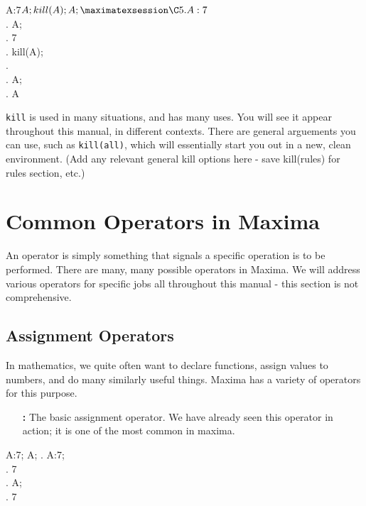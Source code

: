 \beginmaximasession
A:7$
A;
kill(A);
A;
\maximatexsession
\C5.  A:7$ \\
.  A; \\
.   7 \\
.  kill(A); \\
.    \\
.  A; \\
.   A \\
\endmaximasession

\texttt{kill} is used in many situations, and has many uses.  You will 
see it appear throughout this manual, in different contexts.  There are
general arguements you can use, such as \texttt{kill(all)}, which will 
essentially start you out in a new, clean environment. (Add any relevant 
general kill options here - save kill(rules) for rules section, etc.)

\section{Common Operators in Maxima}

An operator is simply something that signals a specific operation is 
to be performed. There are many, many possible operators in Maxima.  
We will address various operators for specific jobs all throughout this 
manual - this section is not comprehensive.  

\subsection{Assignment Operators}

In mathematics, we quite often want to declare functions, assign values to 
numbers, and do many similarly useful things.  Maxima has a variety of 
operators for this purpose.

\begin{enumerate}
\item [\bf{:}] The basic assignment operator.  We have already seen this 
operator in action; it is one of the most common in maxima.
\end{enumerate}

\vspace{3ex}

\beginmaximasession
A:7;
A;
\maximatexsession
{}.  A:7; \\
.   7 \\
.  A; \\
.   7 \\
\endmaximasession

